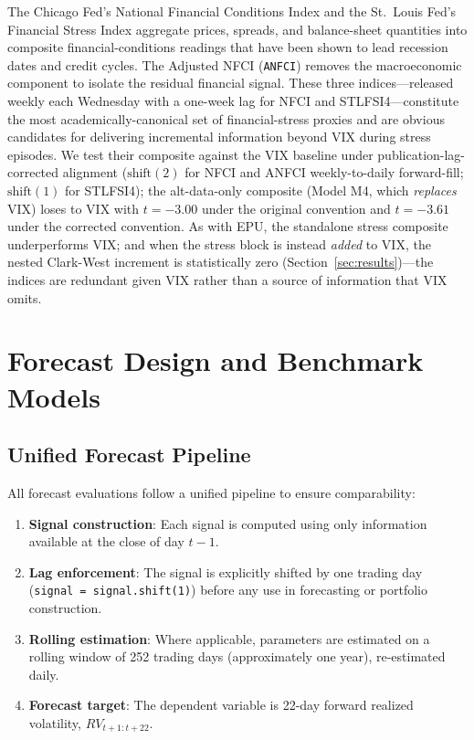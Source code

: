 \documentclass[12pt,a4paper]{article}
\begin{document}
The Chicago Fed's National Financial Conditions Index \citep[NFCI;][]{brave2011} and the St.\ Louis Fed's Financial Stress Index \citep[STLFSI;][]{kliesen2010} aggregate prices, spreads, and balance-sheet quantities into composite financial-conditions readings that have been shown to lead recession dates and credit cycles. The Adjusted NFCI (\texttt{ANFCI}) removes the macroeconomic component to isolate the residual financial signal. These three indices---released weekly each Wednesday with a one-week lag for NFCI and STLFSI4---constitute the most academically-canonical set of financial-stress proxies and are obvious candidates for delivering incremental information beyond VIX during stress episodes. We test their composite against the VIX baseline under publication-lag-corrected alignment ($\text{shift}(2)$ for NFCI and ANFCI weekly-to-daily forward-fill; $\text{shift}(1)$ for STLFSI4); the alt-data-only composite (Model M4, which \emph{replaces} VIX) loses to VIX with $t=-3.00$ under the original convention and $t=-3.61$ under the corrected convention. As with EPU, the standalone stress composite underperforms VIX; and when the stress block is instead \emph{added} to VIX, the nested Clark-West increment is statistically zero (Section~\ref{sec:results})---the indices are redundant given VIX rather than a source of information that VIX omits.


\section{Forecast Design and Benchmark Models}
\label{sec:methodology}

\subsection{Unified Forecast Pipeline}

All forecast evaluations follow a unified pipeline to ensure comparability:

\begin{enumerate}
    \item \textbf{Signal construction}: Each signal is computed using only information available at the close of day $t-1$.
    \item \textbf{Lag enforcement}: The signal is explicitly shifted by one trading day (\texttt{signal = signal.shift(1)}) before any use in forecasting or portfolio construction.
    \item \textbf{Rolling estimation}: Where applicable, parameters are estimated on a rolling window of 252 trading days (approximately one year), re-estimated daily.
    \item \textbf{Forecast target}: The dependent variable is 22-day forward realized volatility, $RV_{t+1:t+22}$.
\end{enumerate}
\end{document}
